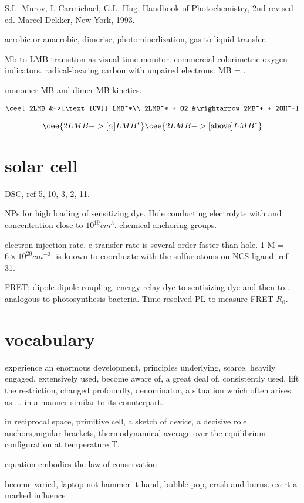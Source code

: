 S.L. Murov, I. Carmichael, G.L. Hug, Handbook of Photochemistry, 2nd revised ed. Marcel Dekker, New York, 1993.

aerobic or anaerobic, dimerise, photominerlization, gas to liquid transfer.

\cite{Galagan2008} Mb to LMB transition as visual time monitor. commercial colorimetric oxygen indicators. radical-bearing carbon with unpaired electrons. MB = .

\cite{Spencer1979} monomer MB and dimer MB kinetics.



\cite{Lee2003a}
\begin{align}
\cee{ 2LMB &->[\text{UV}] LMB^*\\
2LMB^* + O2 &\rightarrow 2MB^+ + 2OH^-}
\end{align}

\[
\cee{2LMB ->[\alpha] LMB^*}
\cee{2LMB ->[\text{above}] LMB^*}
\]
\section{solar cell}

DSC, ref 5, 10, 3, 2, 11.

 NPs for high loading of sensitizing dye. Hole conducting electrolyte with  and  concentration close to $10^19 cm^3$. chemical anchoring groups.

electron injection rate. e transfer rate is several order faster than hole. 1 M = $6\times10^{20} cm^{-3}$.  is known to coordinate with the sulfur atoms on NCS ligand. ref 31. 

FRET: dipole-dipole coupling, energy relay dye to sentisizing dye and then to . analogous to photosynthesis bacteria. Time-resolved PL to measure FRET $R_0$. 



\section{vocabulary}

experience an enormous development, principles underlying, scarce. heavily engaged, extensively used, become aware of, a great deal of, consistently used, lift the restriction, changed profoundly, denominator, a situation which often arises as ... in a manner similar to its counterpart.

in reciprocal space, primitive cell, a sketch of device, a decisive role. anchors,angular brackets, thermodynamical average over the equilibrium configuration at temperature T.

equation embodies the law of conservation

become varied, laptop not hammer it hand, bubble pop, crash and burns. exert a marked influence
